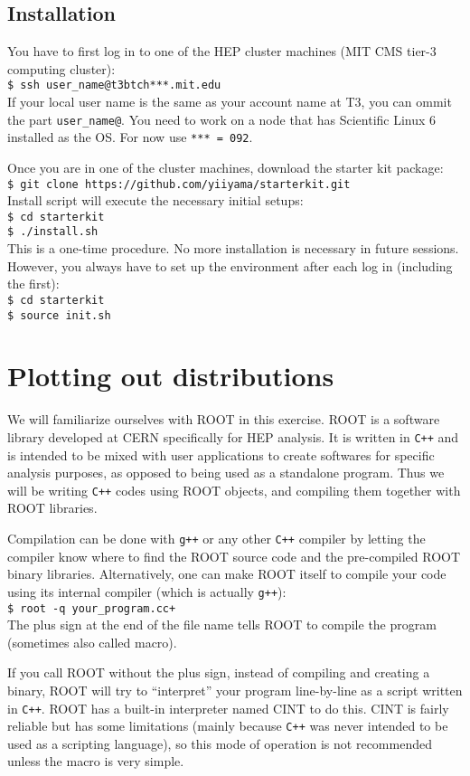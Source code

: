 \documentclass[12pt]{article}
\newcommand{\cpp}{\texttt{C++}\xspace}
\newcommand{\terminal}[1]{\vspace{3pt}\texttt{\$ #1} \\}
\begin{document}
\subsection*{Installation}
You have to first log in to one of the HEP cluster machines (MIT CMS tier-3 computing cluster): \\
\terminal{ssh user\_name@t3btch***.mit.edu}
If your local user name is the same as your account name at T3, you can ommit the part \texttt{user\_name@}. You need to work on a node that has Scientific Linux 6 installed as the OS. For now use \texttt{*** = 092}.

Once you are in one of the cluster machines, download the starter kit package: \\
\terminal{git clone https://github.com/yiiyama/starterkit.git}
Install script will execute the necessary initial setups: \\
\terminal{cd starterkit}
\terminal{./install.sh}
This is a one-time procedure. No more installation is necessary in future sessions. However, you always have to set up the environment after each log in (including the first): \\
\terminal{cd starterkit}
\terminal{source init.sh}

\setcounter{section}{0}

\section{Plotting out distributions}
We will familiarize ourselves with ROOT in this exercise. ROOT is a software library developed at CERN specifically for HEP analysis. It is written in \cpp and is intended to be mixed with user applications to create softwares for specific analysis purposes, as opposed to being used as a standalone program. Thus we will be writing \cpp codes using ROOT objects, and compiling them together with ROOT libraries.

Compilation can be done with \texttt{g++} or any other \cpp compiler by letting the compiler know where to find the ROOT source code and the pre-compiled ROOT binary libraries. Alternatively, one can make ROOT itself to compile your code using its internal compiler (which is actually \texttt{g++}): \\
\terminal{root -q your\_program.cc+}
The plus sign at the end of the file name tells ROOT to compile the program (sometimes also called macro).

If you call ROOT without the plus sign, instead of compiling and creating a binary, ROOT will try to ``interpret'' your program line-by-line as a script written in \cpp. ROOT has a built-in interpreter named CINT to do this. CINT is fairly reliable but has some limitations (mainly because \cpp was never intended to be used as a scripting language), so this mode of operation is not recommended unless the macro is very simple.
\end{document}
